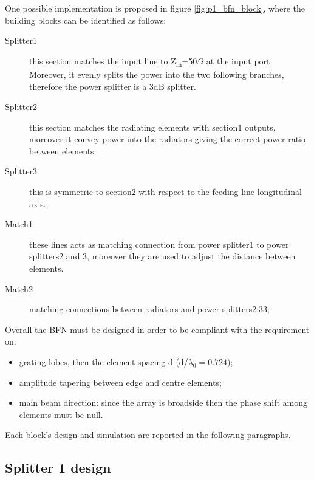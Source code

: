 One possible implementation is proposed in figure \ref{fig:p1_bfn_block}, where the building blocks can be identified as follows: 
\begin{description}
	\item [Splitter1] this section matches the input line to Z\textsubscript{in}=50$\Omega$ at the input port. Moreover, it evenly splits the power into the two following branches, therefore the power splitter is a 3dB splitter. 
	\item [Splitter2] this section matches the radiating elements with section1 outputs, moreover it convey power into the radiators giving the correct power ratio between elements.
	\item [Splitter3] this is symmetric to section2 with respect to the feeding line longitudinal axis. 
	\item [Match1] these lines acts as matching connection from power splitter1 to power splitters2 and 3, moreover they are used to adjust the distance between elements.
	\item [Match2] matching connections between radiators and power splitters2,33;
\end{description}
Overall the BFN must be designed in order to be compliant with the requirement on:
\begin{itemize}
	\item grating lobes, then the element spacing d (d/$\lambda_0=0.724$);
	\item amplitude tapering between edge and centre elements;
	\item main beam direction: since the array is broadside then the phase shift among elements must be null.
\end{itemize}
Each block's design and simulation are reported in the following paragraphs.

\subsection{Splitter 1 design}

